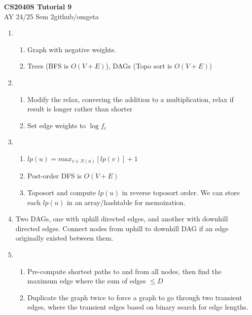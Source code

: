 \documentclass[12pt, a4paper]{article}
\newcommand{\mytitle}{CS2040S Tutorial 9}
\newcommand{\myauthor}{github/omgeta}
\newcommand{\mydate}{AY 24/25 Sem 2}
\begin{document}
\raggedright
\footnotesize
\begin{center}
{\normalsize{\textbf{\mytitle}}} \\
{\footnotesize{\mydate\hspace{2pt}\textemdash\hspace{2pt}\myauthor}}
\end{center}
\begin{enumerate}[Q\arabic*.]
  \item 
    \begin{enumerate}[(\alph*.)]
      \item Graph with negative weights.

      \item Trees (BFS is $O(V+E)$), DAGs (Topo sort is $O(V+E)$) 
    \end{enumerate}

  \item 
    \begin{enumerate}[(\alph*.)]
      \item Modify the relax, convering the addition to a multiplication, relax if result is longer rather than shorter

      \item Set edge weights to $\log f_e$
    \end{enumerate}

  \item 
    \begin{enumerate}[(\alph*.)]
      \item $lp(u) = max_{v\in N(u)}[lp(v)]+1$ 

      \item Post-order DFS is $O(V+E)$

      \item Toposort and compute $lp(u)$ in reverse toposort order. We can store each $lp(u)$ in an array/hashtable for memoization.
    \end{enumerate}

  \item Two DAGs, one with uphill directed edges, and another with downhill directed edges. Connect nodes from uphill to downhill DAG if an edge originally existed between them.

  \item 
    \begin{enumerate}[(\alph*.)]
      \item Pre-compute shortest paths to and from all nodes, then find the maximum edge where the sum of edges $\leq D$

      \item Duplicate the graph twice to force a graph to go through two transient edges, where the transient edges based on binary search for edge lengths.
    \end{enumerate}
\end{enumerate}
\end{document}
